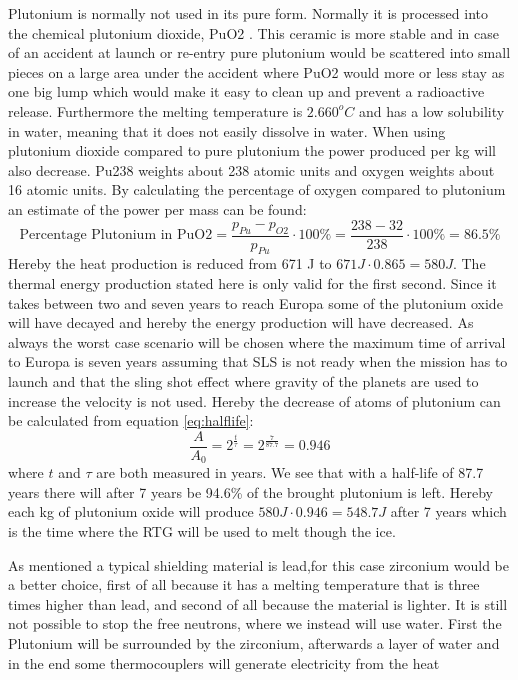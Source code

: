 \noindent
Plutonium is normally not used in its pure form. Normally it is processed into the chemical plutonium dioxide, PuO2 \cite{website:plutoniumoxide}. This ceramic is more stable and in case of an accident at launch or re-entry pure plutonium would be scattered into small pieces on a large area under the accident where PuO2 would more or less stay as one big lump which would make it easy to clean up and prevent a radioactive release. Furthermore the melting temperature is $2.660^oC$ and has a low solubility in water, meaning that it does not easily dissolve in water. When using plutonium dioxide compared to pure plutonium the power produced per kg will also decrease. Pu238 weights about 238 atomic units and oxygen weights about 16 atomic units. By calculating the percentage of oxygen compared to plutonium an estimate of the power per mass can be found: 
\begin{equation*}
\text{Percentage Plutonium in PuO2} = \frac{p_{Pu} - p_{O2}}{p_{Pu}}\cdot 100\% = \frac{238 - 32}{238}\cdot 100\% = 86.5\% 
\end{equation*}
Hereby the heat production is reduced from 671 J to $671J \cdot 0.865 = 580J$. The thermal energy production stated here is only valid for the first second. Since it takes between two and seven years to reach Europa some of the plutonium oxide will have decayed and hereby the energy production will have decreased. As always the worst case scenario will be chosen where the maximum time of arrival to Europa is seven years assuming that SLS is not ready when the mission has to launch and that the sling shot effect where gravity of the planets are used to increase the velocity is not used. Hereby the decrease of atoms of plutonium can be calculated from equation \ref{eq:halflife}: 
\begin{equation}
\frac{A}{A_0} = 2^{\frac{t}{\tau}} = 2^{\frac{7}{87.7}} = 0.946
\end{equation}
where  $t$ and $\tau$ are both measured in years. We see that with a half-life of 87.7 years there will after 7 years be 94.6\% of the brought plutonium is left. Hereby each kg of plutonium oxide will produce $580J \cdot 0.946 = 548.7J$ after 7 years which is the time where the RTG will be used to melt though the ice.

 \label{sec:shielding}
As mentioned a typical shielding material is lead,for this case zirconium would be a better choice, first of all because it has a melting temperature that is three times higher than lead, and second of all because the material is lighter. It is still not possible to stop the free neutrons, where we instead will use water. First the Plutonium will be surrounded by the zirconium, afterwards a layer of water and in the end some thermocouplers will generate electricity from the heat

